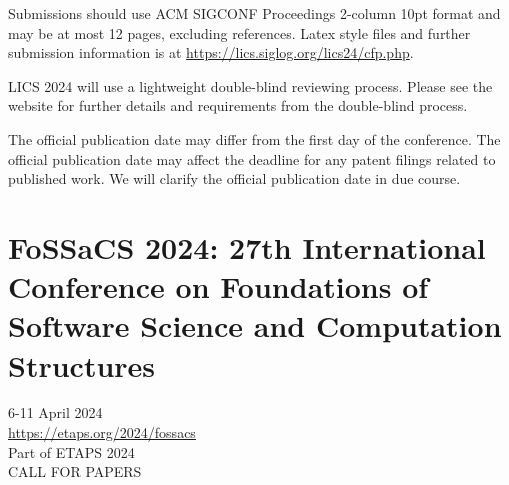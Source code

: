 \documentclass[prodmode,acmtecs]{acmsmall} %
\begin{document}
\begin{itemize}
  Submissions should use ACM SIGCONF Proceedings 2-column 10pt format and may be at most 12 pages, excluding references. Latex style files and further submission information is at \href{https://lics.siglog.org/lics24/cfp.php}{https://lics.siglog.org/lics24/cfp.php}.  
 
  LICS 2024 will use a lightweight double-blind reviewing process. Please see the website for further details and requirements from the double-blind process. 
 
  The official publication date may differ from the first day of the conference. The official publication date may affect the deadline for any patent filings related to published work. We will clarify the official publication date in due course. 
 
\end{itemize}\section{FoSSaCS 2024: 27th International Conference on Foundations of Software Science and Computation Structures}\label{FoSSaCS2024}  6-11 April 2024\\ 
  \href{https://etaps.org/2024/fossacs}{https://etaps.org/2024/fossacs}\\ 
  Part of ETAPS 2024\\ 
CALL FOR PAPERS 
\end{document}
